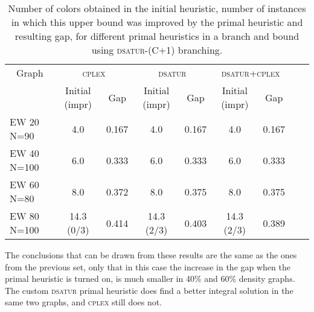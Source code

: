 \begin{table}[h]
\centering
\begin{tabular}{|l|cc|cc|cc|cc|}
\hline
\multicolumn{1}{|c|}{Graph} & \multicolumn{2}{|c|}{\textsc{cplex}} & \multicolumn{2}{|c|}{\textsc{dsatur}} & \multicolumn{2}{|c|}{\textsc{dsatur}+\textsc{cplex}}
\\
& Initial (impr) & Gap & Initial (impr) & Gap & Initial (impr) & Gap
\\
\hline
EW 20 N=90 & 4.0  & 0.167 & 4.0  & 0.167 & 4.0  & 0.167
\\
EW 40 N=100 & 6.0  & 0.333 & 6.0  & 0.333 & 6.0  & 0.333
\\
EW 60 N=80 & 8.0  & 0.372 & 8.0  & 0.375 & 8.0  & 0.375
\\
EW 80 N=100 & 14.3 (0/3) & 0.414 & 14.3 (2/3) & 0.403 & 14.3 (2/3) & 0.389
\\
\hline 
 \end{tabular}
   
\caption{Number of colors obtained in the initial heuristic, number of instances in which this upper bound was improved by the primal heuristic and resulting gap, for different primal heuristics in a branch and bound using \textsc{dsatur-(C+1)} branching.}
\label{table:primal:dsatur}

\end{table}

The conclusions that can be drawn from these results are the same as the ones from the previous set, only that in this case the increase in the gap when the primal heuristic is turned on, is much smaller in 40\% and 60\% density graphs. The custom \textsc{dsatur} primal heuristic does find a better integral solution in the same two graphs, and \textsc{cplex} still does not. 

